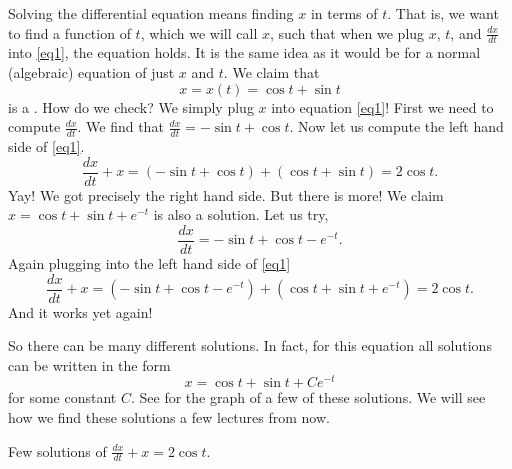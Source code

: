 Solving the differential equation means finding $x$ in terms of $t$.  That
is, we want to find a function of $t$, which we will call $x$, such that when
we plug $x$, $t$, and $\frac{dx}{dt}$ into \eqref{eq1}, the equation holds.
It is
the same idea as it would be for a normal (algebraic) equation of just
$x$ and $t$.  We claim that
\begin{equation*}
x = x(t) = \cos t + \sin t
\end{equation*}
is a \emph{}.
How do we check?  We simply plug $x$ into equation \eqref{eq1}!  First we
need to compute $\frac{dx}{dt}$.  We find that $\frac{dx}{dt} = 
-\sin t + \cos t$.  Now let us compute the left hand side
of \eqref{eq1}.
\begin{equation*}
\frac{dx}{dt} + x = 
(-\sin t + \cos t)
+
(\cos t + \sin t)
=
2\cos t .
\end{equation*}
Yay!  We got precisely the right hand side.
But there is more!
We claim
$x = \cos t + \sin t + e^{-t}$ is also
a solution.  Let us try,
\begin{equation*}
\frac{dx}{dt} = -\sin t + \cos t - e^{-t} .
\end{equation*}
Again plugging into the left hand side of \eqref{eq1}
\begin{equation*}
\frac{dx}{dt} + x = 
(-\sin t + \cos t - e^{-t}) +
(\cos t + \sin t + e^{-t})
= 2\cos t .
\end{equation*}
And it works yet again!

So there can be many different solutions.  In fact, for this equation all
solutions can be written in the form
\begin{equation*}
x = \cos t + \sin t + C e^{-t}
\end{equation*}
for some constant $C$.  See  for the graph of a
few of these solutions. 
We will see how we find these solutions
a few lectures from now.

\begin{diffyfloatingfigurepdfonly}{3.1in}
\capstart
\begin{center}
\caption{Few solutions of $\frac{dx}{dt} + x = 2 \cos t$.\label{intro:plotsfig}}
\end{center}
\end{diffyfloatingfigurepdfonly}

